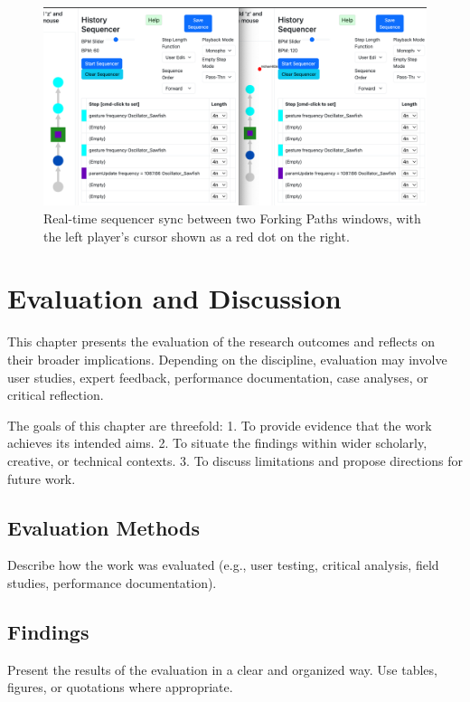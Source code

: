 \documentclass[12pt]{yorkudiss}
\begin{document}
\begin{figure}[htbp]
    \centering
    \includegraphics[width=1\linewidth]{__Figures/MP - Sequencer Syncd.png}
    \caption[Sequencer Synchronization]{Real-time sequencer sync between two Forking Paths windows, with the left player’s cursor shown as a red dot on the right.}
    \label{fig:sequencer-sync}
\end{figure}

\chapter{Evaluation and Discussion}

This chapter presents the evaluation of the research outcomes and reflects on their broader implications. Depending on the discipline, evaluation may involve user studies, expert feedback, performance documentation, case analyses, or critical reflection.  

The goals of this chapter are threefold:  
1. To provide evidence that the work achieves its intended aims.  
2. To situate the findings within wider scholarly, creative, or technical contexts.  
3. To discuss limitations and propose directions for future work.  

\section{Evaluation Methods}
Describe how the work was evaluated (e.g., user testing, critical analysis, field studies, performance documentation).  

\section{Findings}
Present the results of the evaluation in a clear and organized way. Use tables, figures, or quotations where appropriate.  
\end{document}

